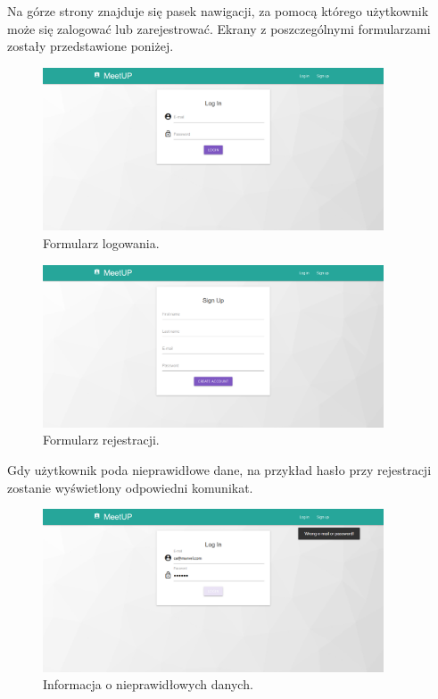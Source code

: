 \documentclass[12pt]{article}
\begin{document}
Na górze strony znajduje się pasek nawigacji, za pomocą którego użytkownik może się zalogować lub zarejestrować. Ekrany z poszczególnymi formularzami zostały przedstawione poniżej.

\begin{figure}[H]
\centering
\includegraphics[width=0.9\textwidth]{meetup_login.png}
\caption{Formularz logowania.}
\end{figure}

\begin{figure}[H]
\centering
\includegraphics[width=0.9\textwidth]{meetup_signup.png}
\caption{Formularz rejestracji.}
\end{figure}

Gdy użytkownik poda nieprawidłowe dane, na przykład hasło przy rejestracji zostanie wyświetlony odpowiedni komunikat.

\begin{figure}[H]
\centering
\includegraphics[width=0.9\textwidth]{meetup_login_error.png}
\caption{Informacja o nieprawidłowych danych.}
\end{figure}
\end{document}
